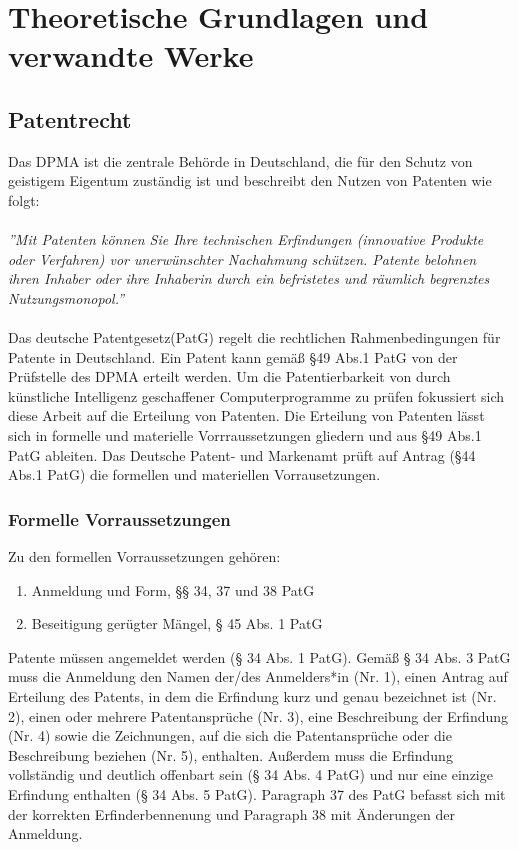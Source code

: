 \chapter{Theoretische Grundlagen und verwandte Werke\label{cha:chapter2}}

\section{Patentrecht\label{sec:Patentrecht}}

Das DPMA ist die zentrale Behörde in Deutschland, die für den Schutz von geistigem Eigentum zuständig ist und beschreibt den Nutzen von Patenten wie folgt:
\\
\\
\textit{''Mit Patenten können Sie Ihre technischen Erfindungen (innovative Produkte oder Verfahren) vor unerwünschter Nachahmung schützen. Patente belohnen ihren Inhaber oder ihre Inhaberin durch ein befristetes und räumlich begrenztes Nutzungsmonopol.''} 
\cite{DPMAPatentschutz}
\\
\\
Das deutsche Patentgesetz(PatG) \cite{PatGNichtamtlichesInhaltsverzeichnis} regelt die rechtlichen Rahmenbedingungen für Patente in Deutschland.
Ein Patent kann gemäß §49 Abs.1 PatG von der Prüfstelle des DPMA erteilt werden. Um die Patentierbarkeit von durch künstliche Intelligenz geschaffener Computerprogramme zu prüfen fokussiert sich diese Arbeit auf die Erteilung von Patenten. Die Erteilung von Patenten lässt sich in formelle und materielle Vorrraussetzungen gliedern und aus §49 Abs.1 PatG ableiten. Das Deutsche Patent- und Markenamt prüft auf Antrag (§44 Abs.1 PatG) die formellen und materiellen Vorrausetzungen.

\subsection{Formelle Vorraussetzungen}

Zu den formellen Vorraussetzungen gehören:
\begin{enumerate}
    \item Anmeldung und Form, §§ 34, 37 und 38 PatG 
    \vspace{-0.11in} 
    \item Beseitigung gerügter Mängel, § 45 Abs. 1 PatG
\end{enumerate}

Patente müssen angemeldet werden (§ 34 Abs. 1 PatG). 
Gemäß § 34 Abs. 3 PatG muss die Anmeldung den Namen der/des Anmelders*in 
(Nr. 1), einen Antrag auf Erteilung des Patents, 
in dem die Erfindung kurz und genau bezeichnet ist (Nr. 2), 
einen oder mehrere Patentansprüche (Nr. 3), 
eine Beschreibung der Erfindung (Nr. 4) sowie die Zeichnungen, 
auf die sich die Patentansprüche oder die Beschreibung beziehen (Nr. 5), 
enthalten. 
Außerdem muss die Erfindung vollständig und deutlich offenbart sein (§ 34 Abs. 4 PatG) 
und nur eine einzige Erfindung enthalten (§ 34 Abs. 5 PatG). 
Paragraph 37 des PatG befasst sich mit der korrekten Erfinderbennenung 
und Paragraph 38 mit Änderungen der Anmeldung. 
\\

